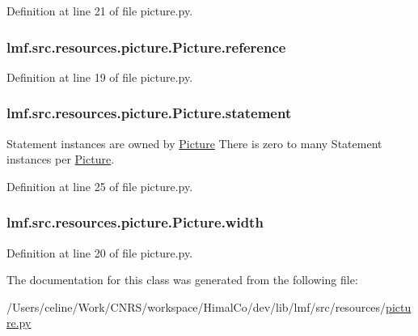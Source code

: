 Definition at line 21 of file picture.\+py.

\hypertarget{classlmf_1_1src_1_1resources_1_1picture_1_1_picture_a0363561d74da7f2fd08b13b8b27c36cb}{
\subsubsection[{reference}]{\setlength{\rightskip}{0pt plus 5cm}lmf.\+src.\+resources.\+picture.\+Picture.\+reference}}\label{classlmf_1_1src_1_1resources_1_1picture_1_1_picture_a0363561d74da7f2fd08b13b8b27c36cb}


Definition at line 19 of file picture.\+py.

\hypertarget{classlmf_1_1src_1_1resources_1_1picture_1_1_picture_ac9b506362a054a04c2dfc776ba853762}{
\subsubsection[{statement}]{\setlength{\rightskip}{0pt plus 5cm}lmf.\+src.\+resources.\+picture.\+Picture.\+statement}}\label{classlmf_1_1src_1_1resources_1_1picture_1_1_picture_ac9b506362a054a04c2dfc776ba853762}


Statement instances are owned by \hyperlink{classlmf_1_1src_1_1resources_1_1picture_1_1_picture}{Picture} There is zero to many Statement instances per \hyperlink{classlmf_1_1src_1_1resources_1_1picture_1_1_picture}{Picture}. 



Definition at line 25 of file picture.\+py.

\hypertarget{classlmf_1_1src_1_1resources_1_1picture_1_1_picture_a1611f370dd4b978d9ed7a0352bc79156}{
\subsubsection[{width}]{\setlength{\rightskip}{0pt plus 5cm}lmf.\+src.\+resources.\+picture.\+Picture.\+width}}\label{classlmf_1_1src_1_1resources_1_1picture_1_1_picture_a1611f370dd4b978d9ed7a0352bc79156}


Definition at line 20 of file picture.\+py.



The documentation for this class was generated from the following file\+:\begin{DoxyCompactItemize}
\item 
/\+Users/celine/\+Work/\+C\+N\+R\+S/workspace/\+Himal\+Co/dev/lib/lmf/src/resources/\hyperlink{picture_8py}{picture.\+py}\end{DoxyCompactItemize}
